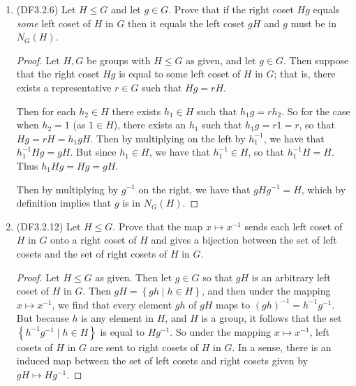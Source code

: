 \documentclass[11pt]{article}
\newcommand{\cbr}[1]{\left\{#1\right\}}
\begin{document}
\begin{enumerate}
\begin{proof}
        Alternatively, because these last three subgroups are of index $2$, we already know that they are normal in $Q_8$ because subgroups of index $2$ are normal subgroups (example from the textbook).

        Hence all subgroups of the quaternion group are normal subgroups.
    \end{proof}
    \item (DF3.2.6) Let $H\leq G$ and let $g\in G$. Prove that if the right coset $Hg$ equals \textit{some} left coset of $H$ in $G$ then it equals the left coset $gH$ and $g$ must be in $N_G(H)$.
    \begin{proof}
        Let $H,G$ be groups with $H\leq G$ as given, and let $g\in G$. Then suppose that the right coset $Hg$ is equal to some left coset of $H$ in $G$; that is, there exists a representative $r\in G$ such that $Hg = rH$. 
        
        Then for each $h_2\in H$ there exists $h_1\in H$ such that $h_1g = rh_2$. So for the case when $h_2 = 1$ (as $1\in H$), there exists an $h_1$ such that $h_1g = r1  = r$, so that $Hg = rH = h_1gH$. Then by multiplying on the left by $h_1^{-1}$, we have that $h_1^{-1}Hg = gH$. But since $h_1\in H$, we have that $h_1^{-1}\in H$, so that $h_1^{-1}H = H$. Thus $h_1Hg = Hg = gH$.

        Then by multiplying by $g^{-1}$ on the right, we have that $gHg^{-1} = H$, which by definition implies that $g$ is in $N_G(H)$.
    \end{proof}
    \item (DF3.2.12) Let $H\leq G$. Prove that the map $x\mapsto x^{-1}$ sends each left coset of $H$ in $G$ onto a right coset of $H$ and gives a bijection between the set of left cosets and the set of right cosets of $H$ in $G$.
    \begin{proof}
        Let $H\leq G$ as given. Then let $g\in G$ so that $gH$ is an arbitrary left coset of $H$ in $G$. Then $gH = \cbr{gh\mid h\in H}$, and then under the mapping $x\mapsto x^{-1}$, we find that every element $gh$ of $gH$ maps to $(gh)^{-1} = h^{-1}g^{-1}$. But because $h$ is any element in $H$, and $H$ is a group, it follows that the set $\cbr{h^{-1}g^{-1}\mid h\in H}$ is equal to $Hg^{-1}$. So under the mapping $x\mapsto x^{-1}$, left cosets of $H$ in $G$ are sent to right cosets of $H$ in $G$. In a sense, there is an induced map between the set of left cosets and right cosets given by $gH\mapsto Hg^{-1}$.


\end{proof}
\end{enumerate}
\end{document}
